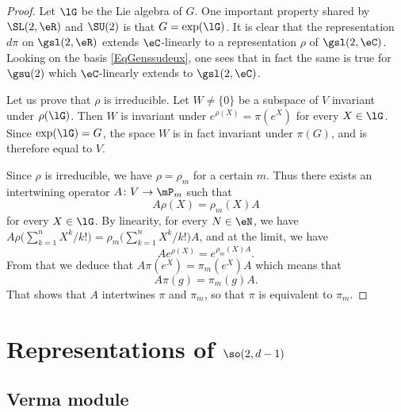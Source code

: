 \begin{proof}
Let $\lG$ be the Lie algebra of $G$. One important property shared by $\SL(2,\eR)$ and $\SU(2)$ is that $G=\exp(\lG)$. It is clear that the representation $d\pi$ on $\gsl(2,\eR)$ extends $\eC$-linearly to a representation $\rho$ of $\gsl(2,\eC)$. Looking on the basis \eqref{EqGenssudeux}, one sees that in fact the same is true for $\gsu(2)$ which $\eC$-linearly extends to $\gsl(2,\eC)$.

Let us prove that $\rho$ is irreducible. Let $W\neq\{ 0 \}$ be a subspace of $V$ invariant under $\rho(\lG)$. Then $W$ is invariant under $ e^{\rho(X)}=\pi( e^{X})$ for every $X\in\lG$. Since $\exp(\lG)=G$, the space $W$ is in fact invariant under $\pi(G)$, and is therefore equal to $V$.

Since $\rho$ is irreducible, we have $\rho=\rho_m$ for a certain $m$. Thus there exists an intertwining operator $A\colon V\to \mP_m$ such that
\[ 
	A\rho(X)=\rho_m(X)A
\]
for every $X\in\lG$. By linearity, for every $N\in\eN$, we have $A\rho\big( \sum_{k=1}^n X^k/k! \big)=\rho_m\big( \sum_{k=1}^n X^k/k! \big)A$, and at the limit, we have
\begin{equation}
	A e^{\rho(X)}= e^{\rho_m(X)A}.
\end{equation}
From that we deduce that $A\pi( e^{X})=\pi_m( e^{X})A$ which means that
\[ 
	A\pi(g)=\pi_m(g)A.
\]
That shows that $A$ intertwines $\pi$ and $\pi_m$, so that $\pi$ is equivalent to $\pi_m$.
\end{proof}
					\section{Representations of \texorpdfstring{$\so(2,d-1)$}{so2d}}

					\subsection{Verma module}

